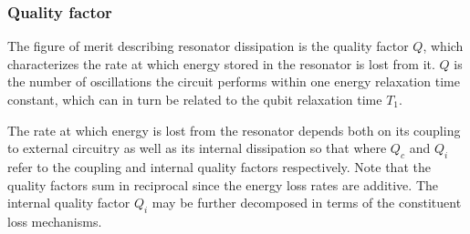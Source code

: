 \vspace*{2em}

\subsubsection{Quality factor}
The figure of merit describing resonator dissipation is the quality factor $Q$,
which characterizes the rate at which energy stored in the resonator is lost from it.  $Q$ is the number of oscillations
the circuit performs within one energy relaxation time constant, which can in turn be related to the qubit relaxation time $T_1$.

The rate at which energy is lost from the resonator depends both on its coupling to external circuitry as well as its internal dissipation so that
where $Q_c$ and $Q_i$ refer to the coupling and internal quality factors respectively.
Note that the quality factors sum in reciprocal since the energy loss rates are additive.
The internal quality factor $Q_i$ may be further decomposed in terms of the constituent loss mechanisms.

